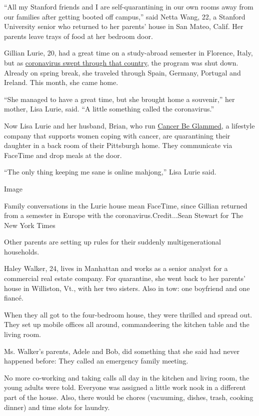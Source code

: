 ``All my Stanford friends and I are self-quarantining in our own rooms
away from our families after getting booted off campus,'' said Netta
Wang, 22, a Stanford University senior who returned to her parents'
house in San Mateo, Calif. Her parents leave trays of food at her
bedroom door.

Gillian Lurie, 20, had a great time on a study-abroad semester in
Florence, Italy, but as
\href{https://www.nytimes3xbfgragh.onion/2020/03/21/world/europe/italy-coronavirus-center-lessons.html}{coronavirus
swept through that country}, the program was shut down. Already on
spring break, she traveled through Spain, Germany, Portugal and Ireland.
This month, she came home.

``She managed to have a great time, but she brought home a souvenir,''
her mother, Lisa Lurie, said. ``A little something called the
coronavirus.''

Now Lisa Lurie and her husband, Brian, who run
\href{http://www.cancerbeglammed.com/}{Cancer Be Glammed}, a lifestyle
company that supports women coping with cancer, are quarantining their
daughter in a back room of their Pittsburgh home. They communicate via
FaceTime and drop meals at the door.

``The only thing keeping me sane is online mahjong,'' Lisa Lurie said.

Image

Family conversations in the Lurie house mean FaceTime, since Gillian
returned from a semester in Europe with the coronavirus.Credit...Sean
Stewart for The New York Times

Other parents are setting up rules for their suddenly multigenerational
households.

Haley Walker, 24, lives in Manhattan and works as a senior analyst for a
commercial real estate company. For quarantine, she went back to her
parents' house in Williston, Vt., with her two sisters. Also in tow: one
boyfriend and one fiancé.

When they all got to the four-bedroom house, they were thrilled and
spread out. They set up mobile offices all around, commandeering the
kitchen table and the living room.

Ms. Walker's parents, Adele and Bob, did something that she said had
never happened before: They called an emergency family meeting.

No more co-working and taking calls all day in the kitchen and living
room, the young adults were told. Everyone was assigned a little work
nook in a different part of the house. Also, there would be chores
(vacuuming, dishes, trash, cooking dinner) and time slots for laundry.

